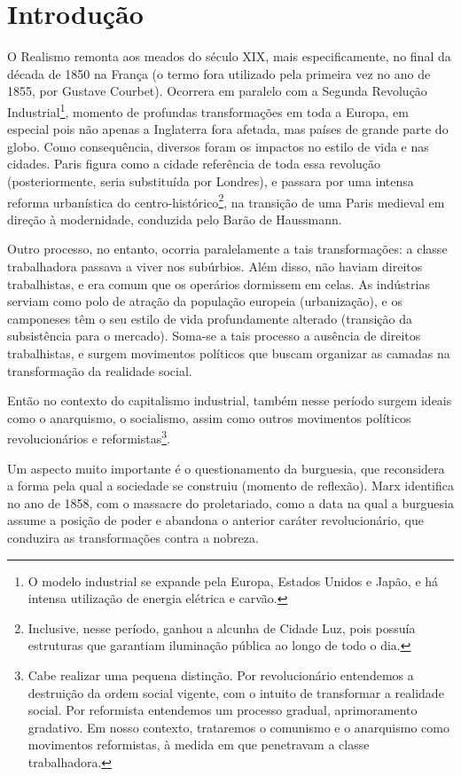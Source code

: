 
\chapter{Introdução}

O Realismo remonta aos meados do século XIX, mais especificamente, no final da década de 1850 na França (o termo fora utilizado pela primeira vez no ano de 1855, por Gustave Courbet). Ocorrera em paralelo com a Segunda Revolução Industrial\footnote{O modelo industrial se expande pela Europa, Estados Unidos e Japão, e há intensa utilização de energia elétrica e carvão.}, momento de profundas transformações em toda a Europa, em especial pois não apenas a Inglaterra fora afetada, mas países de grande parte do globo. Como consequência, diversos foram os impactos no estilo de vida e nas cidades. Paris figura como a cidade referência de toda essa revolução (posteriormente, seria substituída por Londres), e passara por uma intensa reforma urbanística do centro-histórico\footnote{Inclusive, nesse período, ganhou a alcunha de Cidade Luz, pois possuía estruturas que garantiam iluminação pública ao longo de todo o dia.}, na transição de uma Paris medieval em direção à modernidade, conduzida pelo Barão de Haussmann.

Outro processo, no entanto, ocorria paralelamente a tais transformações: a classe trabalhadora passava a viver nos subúrbios. Além disso, não haviam direitos trabalhistas, e era comum que os operários dormissem em celas. As indústrias serviam como polo de atração da população europeia (urbanização), e os camponeses têm o seu estilo de vida profundamente alterado (transição da subsistência para o mercado). Soma-se a tais processo a ausência de direitos trabalhistas, e surgem movimentos políticos que buscam organizar as camadas na transformação da realidade social.

Então no contexto do capitalismo industrial, também nesse período surgem ideais como o anarquismo, o socialismo, assim como outros movimentos políticos revolucionários e reformistas\footnote{Cabe realizar uma pequena distinção. Por revolucionário entendemos a destruição da ordem social vigente, com o intuito de transformar a realidade social. Por reformista entendemos um processo gradual, aprimoramento gradativo. Em nosso contexto, trataremos o comunismo e o anarquismo como movimentos reformistas, à medida em que penetravam a classe trabalhadora.}.

Um aspecto muito importante é o questionamento da burguesia, que reconsidera a forma pela qual a sociedade se construiu (momento de reflexão). Marx identifica no ano de 1858, com o massacre do proletariado, como a data na qual a burguesia assume a posição de poder e abandona o anterior caráter revolucionário, que conduzira as transformações contra a nobreza.

